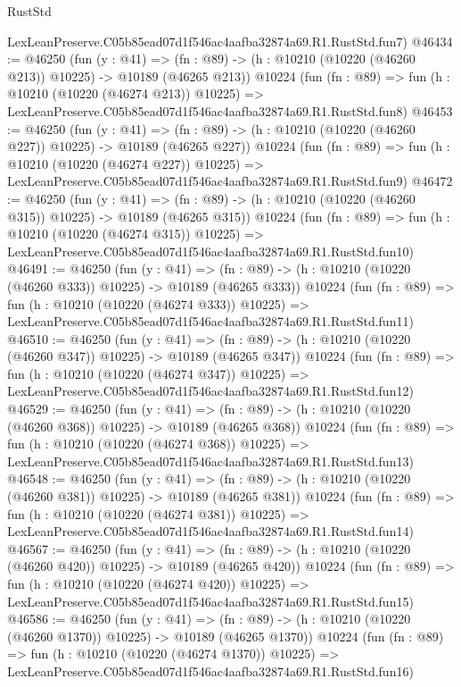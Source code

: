 \begin{lexlean}{RustStd}
\begin{coremodule}
    LexLeanPreserve.C05b85ead07d1f546ac4aafba32874a69.R1.RustStd.fun7)
@46434 := @46250
    (fun (y : @41) =>
    (fn : @89) -> (h : @10210 (@10220 (@46260 @213)) @10225) -> @10189 (@46265 @213))
    @10224
    (fun (fn : @89) =>
    fun (h : @10210 (@10220 (@46274 @213)) @10225) =>
    LexLeanPreserve.C05b85ead07d1f546ac4aafba32874a69.R1.RustStd.fun8)
@46453 := @46250
    (fun (y : @41) =>
    (fn : @89) -> (h : @10210 (@10220 (@46260 @227)) @10225) -> @10189 (@46265 @227))
    @10224
    (fun (fn : @89) =>
    fun (h : @10210 (@10220 (@46274 @227)) @10225) =>
    LexLeanPreserve.C05b85ead07d1f546ac4aafba32874a69.R1.RustStd.fun9)
@46472 := @46250
    (fun (y : @41) =>
    (fn : @89) -> (h : @10210 (@10220 (@46260 @315)) @10225) -> @10189 (@46265 @315))
    @10224
    (fun (fn : @89) =>
    fun (h : @10210 (@10220 (@46274 @315)) @10225) =>
    LexLeanPreserve.C05b85ead07d1f546ac4aafba32874a69.R1.RustStd.fun10)
@46491 := @46250
    (fun (y : @41) =>
    (fn : @89) -> (h : @10210 (@10220 (@46260 @333)) @10225) -> @10189 (@46265 @333))
    @10224
    (fun (fn : @89) =>
    fun (h : @10210 (@10220 (@46274 @333)) @10225) =>
    LexLeanPreserve.C05b85ead07d1f546ac4aafba32874a69.R1.RustStd.fun11)
@46510 := @46250
    (fun (y : @41) =>
    (fn : @89) -> (h : @10210 (@10220 (@46260 @347)) @10225) -> @10189 (@46265 @347))
    @10224
    (fun (fn : @89) =>
    fun (h : @10210 (@10220 (@46274 @347)) @10225) =>
    LexLeanPreserve.C05b85ead07d1f546ac4aafba32874a69.R1.RustStd.fun12)
@46529 := @46250
    (fun (y : @41) =>
    (fn : @89) -> (h : @10210 (@10220 (@46260 @368)) @10225) -> @10189 (@46265 @368))
    @10224
    (fun (fn : @89) =>
    fun (h : @10210 (@10220 (@46274 @368)) @10225) =>
    LexLeanPreserve.C05b85ead07d1f546ac4aafba32874a69.R1.RustStd.fun13)
@46548 := @46250
    (fun (y : @41) =>
    (fn : @89) -> (h : @10210 (@10220 (@46260 @381)) @10225) -> @10189 (@46265 @381))
    @10224
    (fun (fn : @89) =>
    fun (h : @10210 (@10220 (@46274 @381)) @10225) =>
    LexLeanPreserve.C05b85ead07d1f546ac4aafba32874a69.R1.RustStd.fun14)
@46567 := @46250
    (fun (y : @41) =>
    (fn : @89) -> (h : @10210 (@10220 (@46260 @420)) @10225) -> @10189 (@46265 @420))
    @10224
    (fun (fn : @89) =>
    fun (h : @10210 (@10220 (@46274 @420)) @10225) =>
    LexLeanPreserve.C05b85ead07d1f546ac4aafba32874a69.R1.RustStd.fun15)
@46586 := @46250
    (fun (y : @41) =>
    (fn : @89) -> (h : @10210 (@10220 (@46260 @1370)) @10225) -> @10189 (@46265 @1370))
    @10224
    (fun (fn : @89) =>
    fun (h : @10210 (@10220 (@46274 @1370)) @10225) =>
    LexLeanPreserve.C05b85ead07d1f546ac4aafba32874a69.R1.RustStd.fun16)

\end{coremodule}
\end{lexlean}
